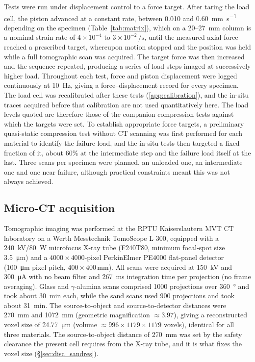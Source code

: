 \documentclass[preprint,12pt,numbers]{elsarticle}
\begin{document}
  Tests were run under displacement control to a force target.  After taring
  the load cell, the piston advanced at a constant rate, between
  \SI{0.010}{} and \SI{0.60}{\milli\meter\per\second} depending on the
  specimen (Table~\ref{tab:matrix}), which on a \SI{20}{}--\SI{27}{\milli\meter}
  column is a nominal strain rate of $4\times10^{-4}$ to
  $3\times10^{-2}\,\si{\per\second}$, until the measured axial force reached a
  prescribed target, whereupon motion stopped and the position was held while
  a full tomographic scan was acquired. The target force was then increased
  and the sequence repeated, producing a series of load steps imaged at
  successively higher load. Throughout each test, force and piston displacement
  were logged continuously at \SI{10}{\hertz}, giving a force--displacement
  record for every specimen.  The load cell was recalibrated after these tests
  (\ref{app:calibration}), and the in-situ traces acquired before that
  calibration are not used quantitatively here.  The load levels quoted are
  therefore those of the companion compression tests against which the targets
  were set.
  To establish appropriate force targets, a preliminary quasi-static
  compression test without CT scanning was first performed for each material to
  identify the failure load, and the in-situ tests then targeted a fixed
  fraction of it, about $60\%$ at the intermediate step and the failure load
  itself at the last.  Three scans per specimen were planned, an unloaded one,
  an intermediate one and one near failure, although practical constraints
  meant this was not always achieved.

  \subsection{Micro-CT acquisition}
  \label{sec:ct}
  Tomographic imaging was performed at the RPTU Kaiserslautern MVT CT laboratory
  on a Werth Messtechnik TomoScope L 300, equipped with a
  \SI{240}{\kilo\volt}/\SI{80}{\watt} microfocus X-ray tube (F240T80, minimum
  focal-spot size \SI{3.5}{\micro\meter}) and a $4000\times4000$-pixel PerkinElmer
  PE4000 flat-panel detector (\SI{100}{\micro\meter} pixel pitch,
  $400\times400$\,\si{\milli\meter}). All scans were acquired at
  \SI{150}{\kilo\volt} and \SI{300}{\micro\ampere} with no beam filter and
  \SI{267}{\milli\second} integration time per projection (no frame averaging).
  Glass and $\gamma$-alumina scans comprised \num{1000} projections over
  \SI{360}{\degree} and took about \SI{30}{\minute} each, while the sand scans
  used \num{900} projections and took about \SI{31}{\minute}. The source-to-object and source-to-detector
  distances were \SI{270}{\milli\meter} and \SI{1072}{\milli\meter} (geometric
  magnification $\approx 3.97$), giving a reconstructed voxel size of
  \SI{24.77}{\micro\meter} (volume $\approx 996\times1179\times1179$ voxels),
  identical for all three materials.
  The source-to-object distance of \SI{270}{\milli\meter} was set by the
  safety clearance the present cell requires from the X-ray tube, and it is
  what fixes the voxel size (\S\ref{sec:disc_sandres}).
\end{document}
